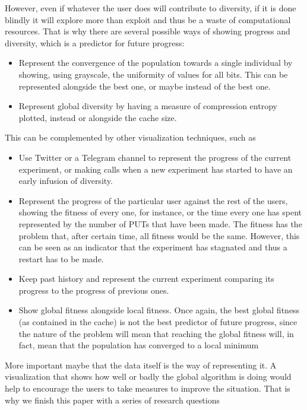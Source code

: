 \documentclass{sig-alternate}
\begin{document}
However, even if whatever the user does will contribute to diversity,
if it is done blindly it will explore more than exploit and thus be a
waste of computational resources. That is why there are several
possible ways of showing progress and diversity, which is a predictor
for future progress:\begin{itemize}
\item Represent the convergence of the population towards a single
  individual by showing, using grayscale, the uniformity of values for
  all bits. This can be represented alongside the best one, or maybe
  instead of the best one.
\item Represent global diversity by having a measure of compression
  entropy plotted, instead or alongside the cache size.
\end{itemize}

This can be complemented by other visualization techniques, such as \begin{itemize}
\item Use Twitter or a Telegram channel to represent the progress of
  the current experiment, or making calls when a new experiment has
  started to have an early infusion of diversity.
\item Represent the progress of the particular user against the rest
  of the users, showing the fitness of every one, for instance, or the
  time every one has spent represented by the number of PUTs that have
  been made. The fitness has the problem that, after certain time, all
  fitness would be the same. However, this can be seen as an indicator
  that the experiment has stagnated and thus a restart has to be made.
\item Keep past history and represent the current experiment comparing its
  progress to the progress of previous ones.
\item Show global fitness alongside local fitness. Once again, the 
  best global fitness (as contained in the cache) is not the best predictor
  of future progress, since the nature of the problem will mean that
  reaching the global fitness will, in fact, mean that the population
  has converged to a local minimum
\end{itemize}

More important maybe that the data itself is the way of representing
it. A visualization that shows how well or badly the global algorithm
is doing would help to encourage the users to take measures to improve
the situation. That is why we finish this paper with a series of
research questions
\end{document}
